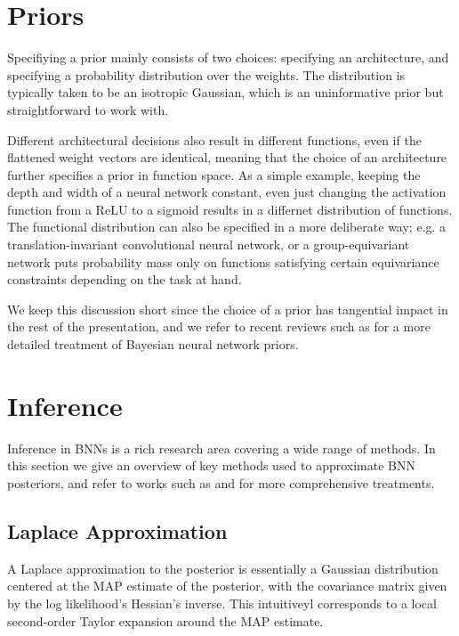 \section{Priors}

Specifiying a prior mainly consists of two choices: specifying an architecture, and specifying a probability distribution over the weights. The distribution is typically taken to be an isotropic Gaussian, which is an uninformative prior but straightforward to work with. 

Different architectural decisions also result in different functions, even if the flattened weight vectors are identical, meaning that the choice of an architecture further specifies a prior in function space. As a simple example, keeping the depth and width of a neural network constant, even just changing the activation function from a ReLU to a sigmoid results in a differnet distribution of functions. The functional distribution can also be specified in a more deliberate way; e.g. a translation-invariant convolutional neural network, or a group-equivariant network \citep{cohenGroupEquivariantConvolutional2016} puts probability mass only on functions satisfying certain equivariance constraints depending on the task at hand. 

We keep this discussion short since the choice of a prior has tangential impact in the rest of the presentation, and we refer to recent reviews such as \citep{fortuinPriorsBayesianDeep2022} for a more detailed treatment of Bayesian neural network priors. 

\section{Inference} \label{section:bayesian_inference}

Inference in BNNs is a rich research area covering a wide range of methods. In this section we give an overview of key methods used to approximate BNN posteriors, and refer to works such as \citep{arbelPrimerBayesianNeural2023} and \citep{murphyProbabilisticMachineLearning2023} for more comprehensive treatments. 

\subsection{Laplace Approximation}

A Laplace approximation to the posterior \citep{mackayPracticalBayesianFramework1992} is essentially a Gaussian distribution centered at the MAP estimate of the posterior, with the covariance matrix given by the log likelihood's Hessian's inverse. This intuitiveyl corresponds to a local second-order Taylor expansion around the MAP estimate. 

